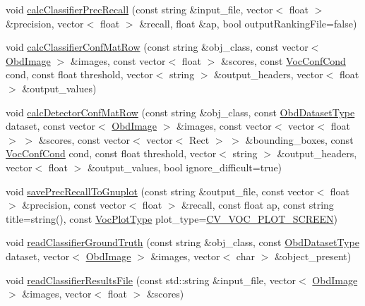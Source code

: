 \begin{DoxyCompactItemize}
\item 
void \hyperlink{classVocData_a9e92b6a7403e18cf25df6165fd56a0bd}{calc\-Classifier\-Prec\-Recall} (const string \&input\-\_\-file, vector$<$ float $>$ \&precision, vector$<$ float $>$ \&recall, float \&ap, bool output\-Ranking\-File=false)
\item 
void \hyperlink{classVocData_ae8de46ec58d21ee43a44e8a771cbfaab}{calc\-Classifier\-Conf\-Mat\-Row} (const string \&obj\-\_\-class, const vector$<$ \hyperlink{classObdImage}{Obd\-Image} $>$ \&images, const vector$<$ float $>$ \&scores, const \hyperlink{bagofwords__classification_8cpp_a86b3fb0f82f82bd78e829cbb81032301}{Voc\-Conf\-Cond} cond, const float threshold, vector$<$ string $>$ \&output\-\_\-headers, vector$<$ float $>$ \&output\-\_\-values)
\item 
void \hyperlink{classVocData_a7b90894f21fbadf8aaf2c3eefa73fb8c}{calc\-Detector\-Conf\-Mat\-Row} (const string \&obj\-\_\-class, const \hyperlink{bagofwords__classification_8cpp_a769a10790da271430ddd42e42073a0ea}{Obd\-Dataset\-Type} dataset, const vector$<$ \hyperlink{classObdImage}{Obd\-Image} $>$ \&images, const vector$<$ vector$<$ float $>$ $>$ \&scores, const vector$<$ vector$<$ Rect $>$ $>$ \&bounding\-\_\-boxes, const \hyperlink{bagofwords__classification_8cpp_a86b3fb0f82f82bd78e829cbb81032301}{Voc\-Conf\-Cond} cond, const float threshold, vector$<$ string $>$ \&output\-\_\-headers, vector$<$ float $>$ \&output\-\_\-values, bool ignore\-\_\-difficult=true)
\item 
void \hyperlink{classVocData_aa6ac26da0ba7878beec8fb3598eaba96}{save\-Prec\-Recall\-To\-Gnuplot} (const string \&output\-\_\-file, const vector$<$ float $>$ \&precision, const vector$<$ float $>$ \&recall, const float ap, const string title=string(), const \hyperlink{bagofwords__classification_8cpp_a9d6bcb462c68f9c035a89cc559acb63f}{Voc\-Plot\-Type} plot\-\_\-type=\hyperlink{bagofwords__classification_8cpp_a9d6bcb462c68f9c035a89cc559acb63fac23aa01b33a316698ea57d9d594bf851}{C\-V\-\_\-\-V\-O\-C\-\_\-\-P\-L\-O\-T\-\_\-\-S\-C\-R\-E\-E\-N})
\item 
void \hyperlink{classVocData_a9580d183da05a4abd31a84699ab23302}{read\-Classifier\-Ground\-Truth} (const string \&obj\-\_\-class, const \hyperlink{bagofwords__classification_8cpp_a769a10790da271430ddd42e42073a0ea}{Obd\-Dataset\-Type} dataset, vector$<$ \hyperlink{classObdImage}{Obd\-Image} $>$ \&images, vector$<$ char $>$ \&object\-\_\-present)
\item 
void \hyperlink{classVocData_ad947e69a36f9569a2f479ac51786a365}{read\-Classifier\-Results\-File} (const std\-::string \&input\-\_\-file, vector$<$ \hyperlink{classObdImage}{Obd\-Image} $>$ \&images, vector$<$ float $>$ \&scores)

\end{DoxyCompactItemize}
